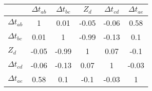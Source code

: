 \begin{tabular}{|l|c|c|c|c|c|}
\hline
&\textbf{$\Delta{t}_{ab}$}&\textbf{$\Delta{t}_{bc}$}&\textbf{$Z_d$}&\textbf{$\Delta{t}_{cd}$}&\textbf{$\Delta{t}_{ae}$}\\\hline
\textbf{$\Delta{t}_{ab}$}&1&0.01&-0.05&-0.06&0.58\\\hline
\textbf{$\Delta{t}_{bc}$}&0.01&1&-0.99&-0.13&0.1\\\hline
\textbf{$Z_d$}&-0.05&-0.99&1&0.07&-0.1\\\hline
\textbf{$\Delta{t}_{cd}$}&-0.06&-0.13&0.07&1&-0.03\\\hline
\textbf{$\Delta{t}_{ae}$}&0.58&0.1&-0.1&-0.03&1\\\hline
\end{tabular}

